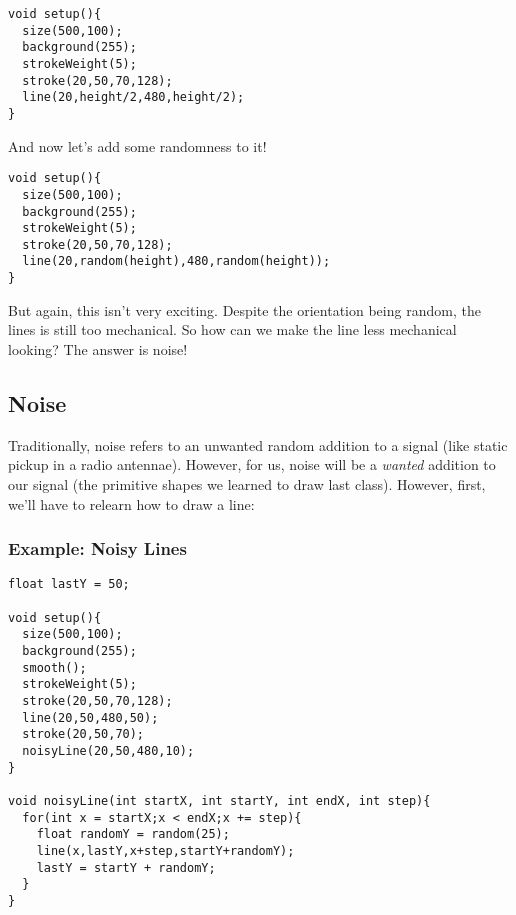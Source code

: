 \begin{verbatim}
void setup(){                                                                                                                                                                                                  
  size(500,100);
  background(255);
  strokeWeight(5);
  stroke(20,50,70,128);
  line(20,height/2,480,height/2);
}
\end{verbatim}

And now let's add some randomness to it!

\begin{verbatim}
void setup(){                                                                                                                                                                                                  
  size(500,100);
  background(255);
  strokeWeight(5);
  stroke(20,50,70,128);
  line(20,random(height),480,random(height));
}
\end{verbatim}

But again, this isn't very exciting.  Despite the orientation being random, the lines is still too mechanical.  So how can we make the line less mechanical looking?  The answer is noise!

\subsection{Noise}
Traditionally, noise refers to an unwanted random addition to a signal (like static pickup in a radio antennae).  However, for us, noise will be a \emph{wanted} addition to our signal (the primitive shapes we learned to draw last class).  However, first, we'll have to relearn how to draw a line:

\subsubsection{Example: Noisy Lines}
\begin{verbatim}
float lastY = 50;

void setup(){                                                                                                                                                                                                  
  size(500,100);
  background(255);
  smooth();
  strokeWeight(5);
  stroke(20,50,70,128);
  line(20,50,480,50);
  stroke(20,50,70);
  noisyLine(20,50,480,10);
}

void noisyLine(int startX, int startY, int endX, int step){
  for(int x = startX;x < endX;x += step){
    float randomY = random(25);
    line(x,lastY,x+step,startY+randomY);
    lastY = startY + randomY;
  }
}
\end{verbatim}

